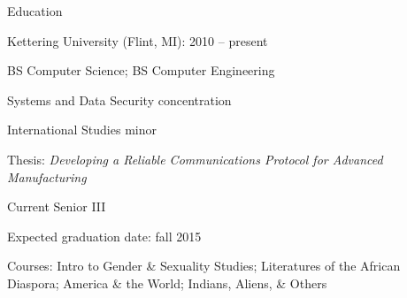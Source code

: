 \documentclass[letterpaper,12pt,oneside,compact]{article}
\begin{document}
\maketitle

\begin{heading}{Education}
\begin{resitem}{Kettering University (Flint, MI): 2010 -- present}
\item BS Computer Science; BS Computer Engineering
\item Systems and Data Security concentration
\item International Studies minor
\item Thesis: \emph{Developing a Reliable Communications Protocol for Advanced Manufacturing}
\item Current Senior III
\item Expected graduation date: fall 2015
\item Courses: Intro to Gender \& Sexuality Studies; Literatures of the African Diaspora; 
      America \& the World; Indians, Aliens, \& Others
\end{resitem}
\end{heading}
\end{document}
